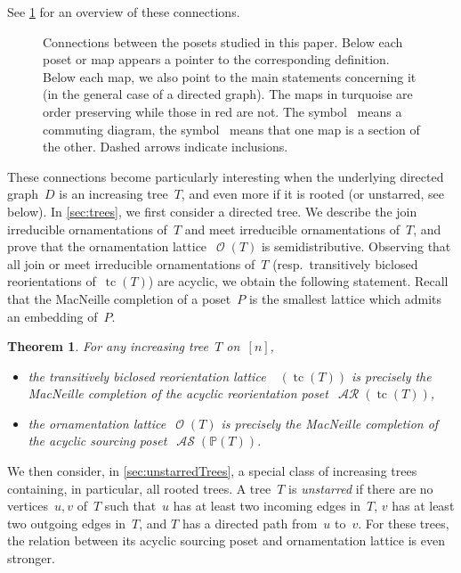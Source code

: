\documentclass{amsart}
\newtheorem{theorem}{Theorem}[section]
\theoremstyle{definition}
\renewcommand{\c}[1]{\mathcal{#1}} %
\DeclareMathOperator{\tc}{tc} %
\newcommand{\darkblue}{\color{darkblue}} %
\newcommand{\defn}[1]{\textsl{\darkblue #1}} %
\DeclareMathOperator{\Orn}{\c{O}}  %
\DeclareMathOperator{\AReori}{\c{AR}}  %
\DeclareMathOperator{\Rbi}{\c{R}^{bi}}  %
\DeclareMathOperator{\ASour}{\mathcal{AS}}  %
\newcommand{\PP}{\mathbb P} %
\begin{document}
See \cref{fig:allMaps} for an overview of these connections.

\begin{figure}
	\centerline{}
	\caption{Connections between the posets studied in this paper. Below each poset or map appears a pointer to the corresponding definition. Below each map, we also point to the main statements concerning it (in the general case of a directed graph). The maps in turquoise are order preserving while those in red are not. The symbol~\smash{\Large$\circlearrowleft$} means a commuting diagram, the symbol~ means that one map is a section of the other. Dashed arrows indicate inclusions.}
	\label{fig:allMaps}
\end{figure}

\medskip
These connections become particularly interesting when the underlying directed graph~$D$ is an increasing tree~$T$, and even more if it is rooted (or unstarred, see below).
In \cref{sec:trees}, we first consider a directed tree.
We describe the join irreducible ornamentations of~$T$ and meet irreducible ornamentations of~$T$, and prove that the ornamentation lattice~$\Orn(T)$ is semidistributive.
Observing that all join or meet irreducible ornamentations of~$T$ (resp.~transitively biclosed reorientations of~$\tc(T)$) are acyclic, we obtain the following statement.
Recall that the MacNeille completion of a poset~$P$ is the smallest lattice which admits an embedding of~$P$.

\begin{theorem}
\label{thm:main1}
For any increasing tree~$T$ on~$[n]$, 
\begin{itemize}
\item the transitively biclosed reorientation lattice~$\Rbi(\tc(T))$ is precisely the MacNeille completion of the acyclic reorientation poset~$\AReori(\tc(T))$,
\item the ornamentation lattice~$\Orn(T)$ is precisely the MacNeille completion of the acyclic sourcing poset~$\ASour(\PP(T))$.
\end{itemize}
\end{theorem}

We then consider, in \cref{sec:unstarredTrees}, a special class of increasing trees containing, in particular, all rooted trees.
A tree~$T$ is \defn{unstarred} if there are no vertices~$u,v$ of~$T$ such that~$u$ has at least two incoming edges in~$T$, $v$ has at least two outgoing edges in~$T$, and $T$ has a directed path from~$u$ to~$v$.
For these trees, the relation between its acyclic sourcing poset and ornamentation lattice is even stronger.
\end{document}
